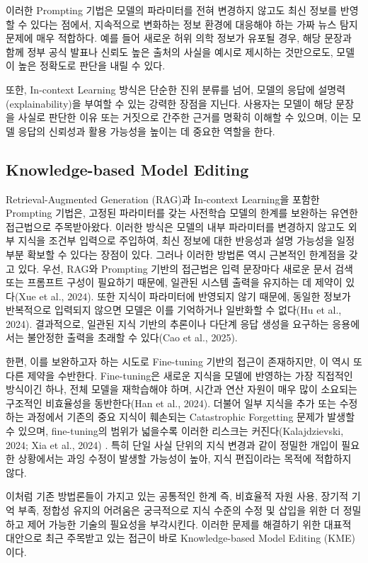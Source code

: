 \documentclass[a4paper,fleqn]{cas-sc}
\begin{document}
이러한 Prompting 기법은 모델의 파라미터를 전혀 변경하지 않고도 최신 정보를 반영할 수 있다는 점에서, 지속적으로 변화하는 정보 환경에 대응해야 하는 가짜 뉴스 탐지 문제에 매우 적합하다. 예를 들어 새로운 허위 의학 정보가 유포될 경우, 해당 문장과 함께 정부 공식 발표나 신뢰도 높은 출처의 사실을 예시로 제시하는 것만으로도, 모델이 높은 정확도로 판단을 내릴 수 있다.

또한, In-context Learning 방식은 단순한 진위 분류를 넘어, 모델의 응답에 설명력(explainability)을 부여할 수 있는 강력한 장점을 지닌다. 사용자는 모델이 해당 문장을 사실로 판단한 이유 또는 거짓으로 간주한 근거를 명확히 이해할 수 있으며, 이는 모델 응답의 신뢰성과 활용 가능성을 높이는 데 중요한 역할을 한다.

\subsection{Knowledge-based Model Editing}
Retrieval-Augmented Generation (RAG)과 In-context Learning을 포함한 Prompting 기법은, 고정된 파라미터를 갖는 사전학습 모델의 한계를 보완하는 유연한 접근법으로 주목받아왔다. 이러한 방식은 모델의 내부 파라미터를 변경하지 않고도 외부 지식을 조건부 입력으로 주입하여, 최신 정보에 대한 반응성과 설명 가능성을 일정 부분 확보할 수 있다는 장점이 있다.
그러나 이러한 방법론 역시 근본적인 한계점을 갖고 있다. 우선, RAG와 Prompting 기반의 접근법은 입력 문장마다 새로운 문서 검색 또는 프롬프트 구성이 필요하기 때문에, 일관된 시스템 출력을 유지하는 데 제약이 있다(Xue et al., 2024). 또한 지식이 파라미터에 반영되지 않기 때문에, 동일한 정보가 반복적으로 입력되지 않으면 모델은 이를 기억하거나 일반화할 수 없다(Hu et al., 2024). 결과적으로, 일관된 지식 기반의 추론이나 다단계 응답 생성을 요구하는 응용에서는 불안정한 출력을 초래할 수 있다(Cao et al., 2025).

한편, 이를 보완하고자 하는 시도로 Fine-tuning 기반의 접근이 존재하지만, 이 역시 또 다른 제약을 수반한다. Fine-tuning은 새로운 지식을 모델에 반영하는 가장 직접적인 방식이긴 하나, 전체 모델을 재학습해야 하며, 시간과 연산 자원이 매우 많이 소요되는 구조적인 비효율성을 동반한다(Han et al., 2024). 더불어 일부 지식을 추가 또는 수정하는 과정에서 기존의 중요 지식이 훼손되는 Catastrophic Forgetting 문제가 발생할 수 있으며, fine-tuning의 범위가 넓을수록 이러한 리스크는 커진다(Kalajdzievski, 2024; Xia et al., 2024) . 특히 단일 사실 단위의 지식 변경과 같이 정밀한 개입이 필요한 상황에서는 과잉 수정이 발생할 가능성이 높아, 지식 편집이라는 목적에 적합하지 않다.

이처럼 기존 방법론들이 가지고 있는 공통적인 한계 즉, 비효율적 자원 사용, 장기적 기억 부족, 정합성 유지의 어려움은 궁극적으로 지식 수준의 수정 및 삽입을 위한 더 정밀하고 제어 가능한 기술의 필요성을 부각시킨다. 이러한 문제를 해결하기 위한 대표적 대안으로 최근 주목받고 있는 접근이 바로 Knowledge-based Model Editing (KME)이다.
\end{document}
